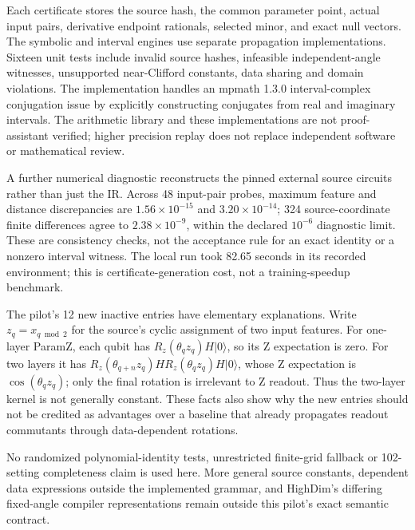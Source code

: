 Each certificate stores the source hash, the common parameter point,
actual input pairs, derivative endpoint rationals, selected minor, and
exact null vectors. The symbolic and interval engines use separate
propagation implementations. Sixteen unit tests include invalid
source hashes, infeasible independent-angle witnesses, unsupported
near-Clifford constants, data sharing and domain violations.
The implementation handles an mpmath 1.3.0 interval-complex conjugation
issue by explicitly constructing conjugates from real and imaginary
intervals. The arithmetic library and these implementations are not
proof-assistant verified; higher precision replay does not replace
independent software or mathematical review.

A further numerical diagnostic reconstructs the pinned external
source circuits rather than just the IR. Across 48 input-pair probes,
maximum feature and distance discrepancies are
$1.56\times10^{-15}$ and $3.20\times10^{-14}$; 324 source-coordinate
finite differences agree to $2.38\times10^{-9}$, within the declared
$10^{-6}$ diagnostic limit. These are consistency checks, not the
acceptance rule for an exact identity or a nonzero interval witness.
The local run took 82.65 seconds in its recorded environment; this is
certificate-generation cost, not a training-speedup benchmark.

The pilot's 12 new inactive entries have elementary explanations.
Write $z_q=x_{q\bmod2}$ for the source's cyclic assignment of two input
features. For one-layer ParamZ, each qubit has $R_z(\theta_qz_q)H|0\rangle$,
so its Z expectation is zero. For two layers it has
$R_z(\theta_{q+n}z_q)H R_z(\theta_qz_q)H|0\rangle$,
whose Z expectation is $\cos(\theta_qz_q)$; only the final rotation is
irrelevant to Z readout. Thus the two-layer kernel is not generally
constant. These facts also show why the new entries should not be
credited as advantages over a baseline that already propagates
readout commutants through data-dependent rotations.

No randomized polynomial-identity tests, unrestricted finite-grid
fallback or 102-setting completeness claim is used here. More
general source constants, dependent data expressions outside the
implemented grammar, and HighDim's differing fixed-angle compiler
representations remain outside this pilot's exact semantic contract.
